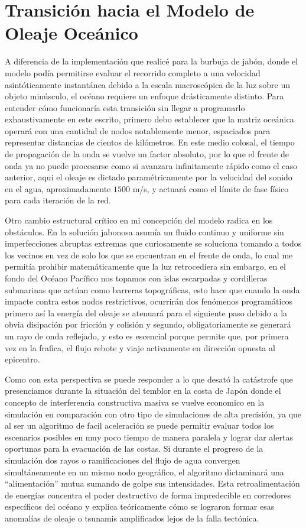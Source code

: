 \section{Transición hacia el Modelo de Oleaje Oceánico}

A diferencia de la implementación que realicé para la burbuja de jabón, donde el modelo podía permitirse evaluar el recorrido completo a una velocidad asintóticamente instantánea debido a la escala macroscópica de la luz sobre un objeto minúsculo, el océano requiere un enfoque drásticamente distinto. Para entender cómo funcionaría esta transición sin llegar a programarlo exhaustivamente en este escrito, primero debo establecer que la matriz oceánica operará con una cantidad de nodos notablemente menor, espaciados para representar distancias de cientos de kilómetros. En este medio colosal, el tiempo de propagación de la onda se vuelve un factor absoluto, por lo que el frente de onda ya no puede procesarse como si avanzara infinitamente rápido como el caso anterior, aqui el oleaje es dictado paramétricamente por la velocidad del sonido en el agua, aproximadamente $1500$ m/s, y actuará como el límite de fase físico para cada iteración de la red.

Otro cambio estructural crítico en mi concepción del modelo radica en los obstáculos. En la solución jabonosa asumía un fluido continuo y uniforme sin imperfecciones abruptas extremas que curiosamente se soluciona tomando a todos los vecinos en vez de solo los que se encuentran en el frente de onda, lo cual me permitía prohibir matemáticamente que la luz retrocediera sin embargo, en el fondo del Océano Pacífico nos topamos con islas escarpadas y cordilleras submarinas que actúan como barreras topográficas, esto hace que cuando la onda impacte contra estos nodos restrictivos, ocurrirán dos fenómenos programáticos primero así la energía del oleaje se atenuará para el siguiente paso debido a la obvia disipación por fricción y colisión y segundo, obligatoriamente se generará un rayo de onda reflejado, y esto es escencial porque permite que, por primera vez en la frafica, el flujo rebote y viaje activamente en dirección opuesta al epicentro.

Como con esta perspectiva se puede responder a lo que desató la catástrofe que presenciamos durante la situación del temblor en la costa de Japón donde el concepto de interferencia constructiva masiva se vuelve economico en la simulación en comparación con otro tipo de simulaciones de alta precisión, ya que al ser un algoritmo de facil aceleración se puede permitir evaluar todos los escenarios posibles en muy poco tiempo de manera paralela y lograr dar alertas oportunas para la evacuación de las costas. Si durante el progreso de la simulación dos rayos o ramificaciones del flujo de agua convergen simultáneamente en un mismo nodo geográfico, el algoritmo dictaminará una ``alimentación'' mutua sumando de golpe sus intensidades. Esta retroalimentación de energías concentra el poder destructivo de forma impredecible en corredores específicos del océano y explica teóricamente cómo se lograron formar esas anomalías de oleaje o tsunamis amplificados lejos de la falla tectónica.

